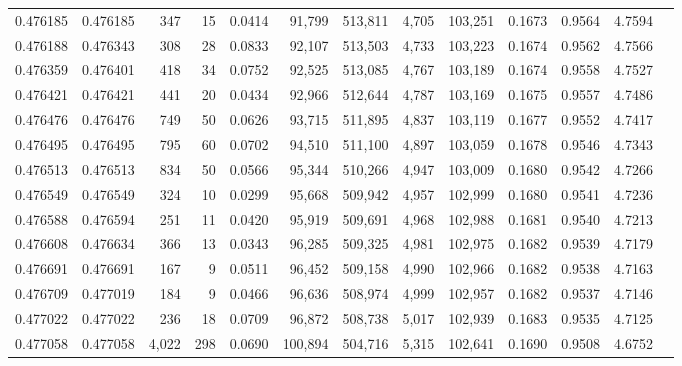 \begin{tabular}{rrrrrrrrrrrrr}
0.476185 & 0.476185 &   347 &    15 &                                     0.0414 &  91,799 & 513,811 &   4,705 & 103,251 & 0.1673 & 0.9564 & 4.7594 \\
0.476188 & 0.476343 &   308 &    28 &                                     0.0833 &  92,107 & 513,503 &   4,733 & 103,223 & 0.1674 & 0.9562 & 4.7566 \\
0.476359 & 0.476401 &   418 &    34 &                                     0.0752 &  92,525 & 513,085 &   4,767 & 103,189 & 0.1674 & 0.9558 & 4.7527 \\
0.476421 & 0.476421 &   441 &    20 &                                     0.0434 &  92,966 & 512,644 &   4,787 & 103,169 & 0.1675 & 0.9557 & 4.7486 \\
0.476476 & 0.476476 &   749 &    50 &                                     0.0626 &  93,715 & 511,895 &   4,837 & 103,119 & 0.1677 & 0.9552 & 4.7417 \\
0.476495 & 0.476495 &   795 &    60 &                                     0.0702 &  94,510 & 511,100 &   4,897 & 103,059 & 0.1678 & 0.9546 & 4.7343 \\
0.476513 & 0.476513 &   834 &    50 &                                     0.0566 &  95,344 & 510,266 &   4,947 & 103,009 & 0.1680 & 0.9542 & 4.7266 \\
0.476549 & 0.476549 &   324 &    10 &                                     0.0299 &  95,668 & 509,942 &   4,957 & 102,999 & 0.1680 & 0.9541 & 4.7236 \\
0.476588 & 0.476594 &   251 &    11 &                                     0.0420 &  95,919 & 509,691 &   4,968 & 102,988 & 0.1681 & 0.9540 & 4.7213 \\
0.476608 & 0.476634 &   366 &    13 &                                     0.0343 &  96,285 & 509,325 &   4,981 & 102,975 & 0.1682 & 0.9539 & 4.7179 \\
0.476691 & 0.476691 &   167 &     9 &                                     0.0511 &  96,452 & 509,158 &   4,990 & 102,966 & 0.1682 & 0.9538 & 4.7163 \\
0.476709 & 0.477019 &   184 &     9 &                                     0.0466 &  96,636 & 508,974 &   4,999 & 102,957 & 0.1682 & 0.9537 & 4.7146 \\
0.477022 & 0.477022 &   236 &    18 &                                     0.0709 &  96,872 & 508,738 &   5,017 & 102,939 & 0.1683 & 0.9535 & 4.7125 \\
0.477058 & 0.477058 & 4,022 &   298 &                                     0.0690 & 100,894 & 504,716 &   5,315 & 102,641 & 0.1690 & 0.9508 & 4.6752 \\

\end{tabular}
